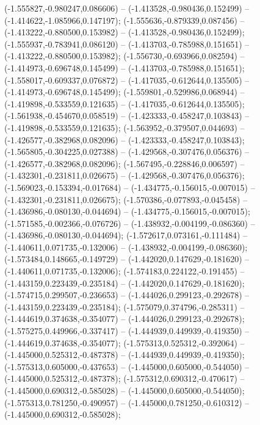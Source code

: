  (-1.555827,-0.980247,0.086606) -- (-1.413528,-0.980436,0.152499) -- (-1.414622,-1.085966,0.147197);
 (-1.555636,-0.879339,0.087456) -- (-1.413222,-0.880500,0.153982) -- (-1.413528,-0.980436,0.152499);
 (-1.555937,-0.783941,0.086120) -- (-1.413703,-0.785988,0.151651) -- (-1.413222,-0.880500,0.153982);
 (-1.556730,-0.693966,0.082594) -- (-1.414973,-0.696748,0.145499) -- (-1.413703,-0.785988,0.151651);
 (-1.558017,-0.609337,0.076872) -- (-1.417035,-0.612644,0.135505) -- (-1.414973,-0.696748,0.145499);
 (-1.559801,-0.529986,0.068944) -- (-1.419898,-0.533559,0.121635) -- (-1.417035,-0.612644,0.135505);
 (-1.561938,-0.454670,0.058519) -- (-1.423333,-0.458247,0.103843) -- (-1.419898,-0.533559,0.121635);
 (-1.563952,-0.379507,0.044693) -- (-1.426577,-0.382968,0.082096) -- (-1.423333,-0.458247,0.103843);
 (-1.565805,-0.304225,0.027388) -- (-1.429568,-0.307476,0.056376) -- (-1.426577,-0.382968,0.082096);
 (-1.567495,-0.228846,0.006597) -- (-1.432301,-0.231811,0.026675) -- (-1.429568,-0.307476,0.056376);
 (-1.569023,-0.153394,-0.017684) -- (-1.434775,-0.156015,-0.007015) -- (-1.432301,-0.231811,0.026675);
 (-1.570386,-0.077893,-0.045458) -- (-1.436986,-0.080130,-0.044694) -- (-1.434775,-0.156015,-0.007015);
 (-1.571585,-0.002366,-0.076726) -- (-1.438932,-0.004199,-0.086360) -- (-1.436986,-0.080130,-0.044694);
 (-1.572617,0.073161,-0.111484) -- (-1.440611,0.071735,-0.132006) -- (-1.438932,-0.004199,-0.086360);
 (-1.573484,0.148665,-0.149729) -- (-1.442020,0.147629,-0.181620) -- (-1.440611,0.071735,-0.132006);
 (-1.574183,0.224122,-0.191455) -- (-1.443159,0.223439,-0.235184) -- (-1.442020,0.147629,-0.181620);
 (-1.574715,0.299507,-0.236653) -- (-1.444026,0.299123,-0.292678) -- (-1.443159,0.223439,-0.235184);
 (-1.575079,0.374796,-0.285311) -- (-1.444619,0.374638,-0.354077) -- (-1.444026,0.299123,-0.292678);
 (-1.575275,0.449966,-0.337417) -- (-1.444939,0.449939,-0.419350) -- (-1.444619,0.374638,-0.354077);
 (-1.575313,0.525312,-0.392064) -- (-1.445000,0.525312,-0.487378) -- (-1.444939,0.449939,-0.419350);
 (-1.575313,0.605000,-0.437653) -- (-1.445000,0.605000,-0.544050) -- (-1.445000,0.525312,-0.487378);
 (-1.575312,0.690312,-0.470617) -- (-1.445000,0.690312,-0.585028) -- (-1.445000,0.605000,-0.544050);
 (-1.575313,0.781250,-0.490957) -- (-1.445000,0.781250,-0.610312) -- (-1.445000,0.690312,-0.585028);
